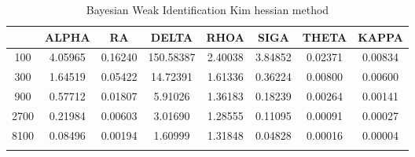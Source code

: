 \documentclass[a4paper,10pt]{article}
\begin{document}
\centering
\begin{longtable}{cccccccc}
\toprule
 & ALPHA & RA & DELTA & RHOA & SIGA & THETA & KAPPA \\
\midrule
100 & 4.05965 & 0.16240 & 150.58387 & 2.40038 & 3.84852 & 0.02371 & 0.00834 \\
300 & 1.64519 & 0.05422 & 14.72391 & 1.61336 & 0.36224 & 0.00800 & 0.00600 \\
900 & 0.57712 & 0.01807 & 5.91026 & 1.36183 & 0.18239 & 0.00264 & 0.00141 \\
2700 & 0.21984 & 0.00603 & 3.01690 & 1.28555 & 0.11095 & 0.00091 & 0.00027 \\
8100 & 0.08496 & 0.00194 & 1.60999 & 1.31848 & 0.04828 & 0.00016 & 0.00004 \\
\bottomrule
\caption{Bayesian Weak Identification Kim hessian method}
\label{table:tbl:WeakKim_hessian}
\end{longtable}
\end{document}

